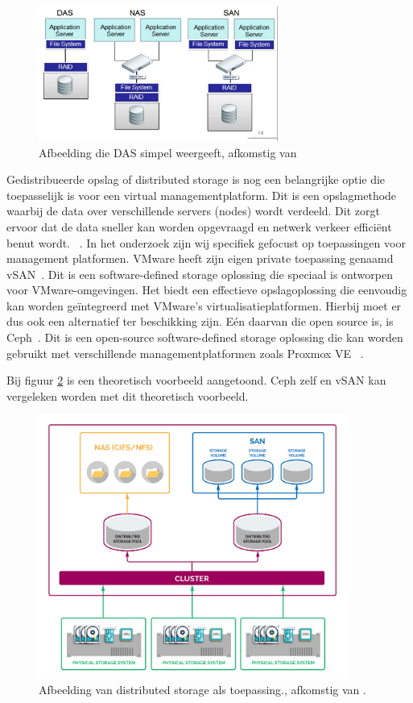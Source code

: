 \begin{figure}[h!]
    \centering
    \includegraphics[width=0.7\textwidth]{../onderzoek/DAS.jpg} 
    \caption{Afbeelding die DAS simpel weergeeft, afkomstig van \textcite{tekmart2020nasvsdas}}
    \label{fig:das}
\end{figure}
\FloatBarrier
Gedistribueerde opslag of distributed storage is nog een belangrijke optie die toepasselijk is voor een virtual managementplatform. Dit is een opslagmethode waarbij de data over verschillende servers (nodes) wordt verdeeld.
Dit zorgt ervoor dat de data sneller kan worden opgevraagd en netwerk verkeer efficiënt benut wordt. ~\autocite{patil2010unified}.
In het onderzoek zijn wij specifiek gefocust op toepassingen voor management platformen. VMware heeft zijn eigen private toepassing genaamd vSAN~\autocite{hogan2016essential}. Dit is een software-defined storage oplossing die speciaal is ontworpen voor VMware-omgevingen. Het biedt een effectieve opslagoplossing die eenvoudig kan worden geïntegreerd met VMware's virtualisatieplatformen.
Hierbij moet er dus ook een alternatief ter beschikking zijn. Eén daarvan die open source is, is Ceph~\autocite{weil2006ceph}. Dit is een open-source software-defined storage oplossing die kan worden gebruikt met verschillende managementplatformen zoals Proxmox VE ~\autocite{Proxmox}.

Bij figuur \ref{fig:das} is een theoretisch voorbeeld aangetoond. Ceph zelf en vSAN kan vergeleken worden met dit theoretisch voorbeeld.
\begin{figure}[h!]
  \centering
  \includegraphics[width=0.9\textwidth]{../onderzoek/dssep.png} 
  \caption{Afbeelding van distributed storage als toepassing., afkomstig van \textcite{pb2022storage}.}
  \label{fig:das}
\end{figure}

